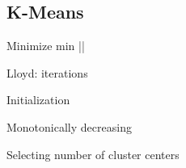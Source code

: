 \subsection{K-Means}

Minimize min ||

Lloyd: iterations

Initialization

Monotonically decreasing

Selecting number of cluster centers